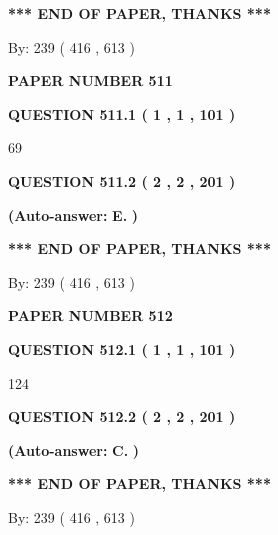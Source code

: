 \documentclass{ctexart}
\begin{document}
 
   
   
   
   
\vspace{1.0in} 
{\textbf{\large{ *** END OF PAPER, THANKS *** }}} 
   
   
\hspace{1.0in} By: 
 239 ( 416 ,  613 )
   
   
   
   
\newpage 
\setcounter{page}{ 
   511001 } 
   
   
 {\textbf{ \Large{ PAPER NUMBER  511  }}}
   
   
   
   
  
  
{\textbf{\large{QUESTION
511.1 
 ( 1 , 1 , 101 )
}}}

69
  
  
{\textbf{\large{QUESTION
511.2 
 ( 2 , 2 , 201 )
}}}
 
 
{\textbf{(Auto-answer:}}
{\textbf{\large{
E.}}}
{\textbf{)}}
 
 
   
   
   
   
\vspace{1.0in} 
{\textbf{\large{ *** END OF PAPER, THANKS *** }}} 
   
   
\hspace{1.0in} By: 
 239 ( 416 ,  613 )
   
   
   
   
\newpage 
\setcounter{page}{ 
   512001 } 
   
   
 {\textbf{ \Large{ PAPER NUMBER  512  }}}
   
   
   
   
  
  
{\textbf{\large{QUESTION
512.1 
 ( 1 , 1 , 101 )
}}}

124
  
  
{\textbf{\large{QUESTION
512.2 
 ( 2 , 2 , 201 )
}}}
 
 
{\textbf{(Auto-answer:}}
{\textbf{\large{
C.}}}
{\textbf{)}}
 
 
   
   
   
   
\vspace{1.0in} 
{\textbf{\large{ *** END OF PAPER, THANKS *** }}} 
   
   
\hspace{1.0in} By: 
 239 ( 416 ,  613 )
   
   
   
   
\newpage 
\setcounter{page}{ 
   513001 } 
   
\end{document}
